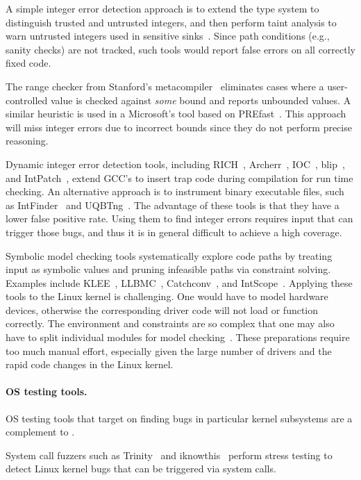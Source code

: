 A simple integer error detection approach is to extend the type
system to distinguish trusted and untrusted integers, and then
perform taint analysis to warn untrusted integers used in sensitive
sinks~\cite{cqual, lclint}.  Since path conditions (e.g., sanity
checks) are not tracked, such tools would report false errors on
all correctly fixed code.

The range checker from Stanford's metacompiler~\cite{range-checker}
eliminates cases where a user-controlled value is checked against
\emph{some} bound and reports unbounded values.  A similar heuristic
is used in a Microsoft's tool based on PREfast~\cite{prefast}.  This
approach will miss integer errors due to incorrect bounds since
they do not perform precise reasoning.

Dynamic integer error detection tools,
including
RICH~\cite{brumley:rich},
Archerr~\cite{archerr},
IOC~\cite{ioc},
blip~\cite{blip},
and
IntPatch~\cite{intpatch},
extend GCC's  to insert trap code during compilation for
run time checking.
%
An alternative approach is to instrument binary executable files,
such as IntFinder~\cite{intfinder} and UQBTng~\cite{uqbtng}.
%
The advantage of these tools is that they have a lower false positive rate.
Using them to find integer errors requires input that can trigger
those bugs, and thus it is in general difficult to achieve a high
coverage.

Symbolic model checking tools systematically explore code paths by
treating input as symbolic values and pruning infeasible paths via
constraint solving.  Examples include
KLEE~\cite{cadar:klee},
LLBMC~\cite{llbmc},
Catchconv~\cite{molnar:catchconv},
and
IntScope~\cite{intscope}.
Applying these tools to the Linux kernel is challenging.  One would
have to model hardware devices, otherwise the corresponding driver
code will not load or function correctly.  The environment and
constraints are so complex that one may also have to split
individual modules for model checking~\cite{engler:vs}.  These
preparations require too much manual effort, especially given the
large number of drivers and the rapid code changes in the Linux
kernel.

\paragraph{OS testing tools.}
OS testing tools that target on finding bugs in particular kernel
subsystems are a complement to \sys.

System call fuzzers such as Trinity~\cite{trinity} and
iknowthis~\cite{iknowthis} perform stress testing to detect
Linux kernel bugs that can be triggered via system calls.

